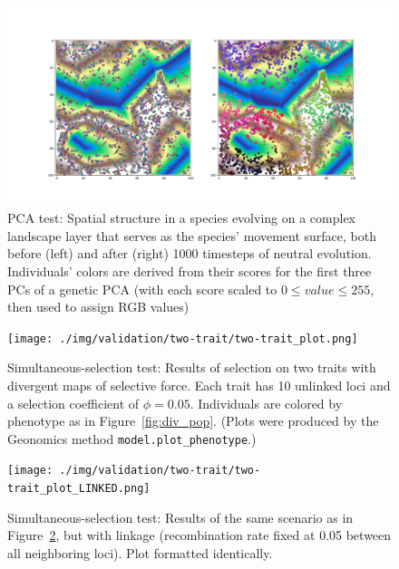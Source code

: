 ﻿\documentclass{article}
\begin{document}
\begin{figure}[ht!]
        \includegraphics[width=175mm]{./img/final/PCA.pdf}
        \caption{PCA test: Spatial structure in a species evolving
                 on a complex landscape layer that serves as
                 the species' movement surface, both before (left)
                 and after (right) 1000 timesteps of neutral evolution.
                 Individuals' colors are derived from their scores
                 for the first three PCs of a genetic PCA
                 (with each score scaled to $0\leq value\leq255$,
                 then used to assign RGB values)}
        \label{fig:PCA}
\end{figure}


\begin{figure}[ht!]
        \texttt{[image: ./img/validation/two-trait/two-trait\_plot.png]}
        \caption{Simultaneous-selection test: Results of selection
                 on two traits with divergent maps of selective force.
                 Each trait has 10 unlinked loci
                 and a selection coefficient of $\phi = 0.05$.
                 Individuals are colored by phenotype as in Figure~\ref{fig:div_pop}.
                 (Plots were produced by the Geonomics method
                 \texttt{model.plot\_phenotype}.)}
        \label{fig:two_trait_unlinked}
\end{figure}


\begin{figure}[ht!]
        \texttt{[image: ./img/validation/two-trait/two-trait\_plot\_LINKED.png]}
         \caption{Simultaneous-selection test: Results of the same
                 scenario as in Figure~\ref{fig:two_trait_unlinked},
                 but with linkage (recombination rate fixed at 0.05
                 between all neighboring loci).
                 Plot formatted identically.}
        \label{fig:two_trait_linked}
\end{figure}
\end{document}
